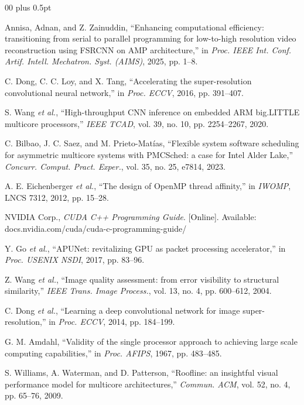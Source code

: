 \documentclass[conference]{IEEEtran}
\begin{document}
\begin{thebibliography}{00}
\footnotesize
\itemsep0pt plus 0.5pt

 Annisa, Adnan, and Z. Zainuddin, ``Enhancing computational efficiency: transitioning from serial to parallel programming for low-to-high resolution video reconstruction using FSRCNN on AMP architecture,'' in \emph{Proc. IEEE Int. Conf. Artif. Intell. Mechatron. Syst. (AIMS)}, 2025, pp. 1--8.

 C. Dong, C. C. Loy, and X. Tang, ``Accelerating the super-resolution convolutional neural network,'' in \emph{Proc. ECCV}, 2016, pp. 391--407.

 S. Wang \emph{et al.}, ``High-throughput CNN inference on embedded ARM big.LITTLE multicore processors,'' \emph{IEEE TCAD}, vol. 39, no. 10, pp. 2254--2267, 2020.

 C. Bilbao, J. C. Saez, and M. Prieto-Mat\'ias, ``Flexible system software scheduling for asymmetric multicore systems with PMCSched: a case for Intel Alder Lake,'' \emph{Concurr. Comput. Pract. Exper.}, vol. 35, no. 25, e7814, 2023.

 A. E. Eichenberger \emph{et al.}, ``The design of OpenMP thread affinity,'' in \emph{IWOMP}, LNCS 7312, 2012, pp. 15--28.

 NVIDIA Corp., \emph{CUDA C++ Programming Guide}. [Online]. Available: docs.nvidia.com/cuda/cuda-c-programming-guide/

 Y. Go \emph{et al.}, ``APUNet: revitalizing GPU as packet processing accelerator,'' in \emph{Proc. USENIX NSDI}, 2017, pp. 83--96.

 Z. Wang \emph{et al.}, ``Image quality assessment: from error visibility to structural similarity,'' \emph{IEEE Trans. Image Process.}, vol. 13, no. 4, pp. 600--612, 2004.

 C. Dong \emph{et al.}, ``Learning a deep convolutional network for image super-resolution,'' in \emph{Proc. ECCV}, 2014, pp. 184--199.

 G. M. Amdahl, ``Validity of the single processor approach to achieving large scale computing capabilities,'' in \emph{Proc. AFIPS}, 1967, pp. 483--485.

 S. Williams, A. Waterman, and D. Patterson, ``Roofline: an insightful visual performance model for multicore architectures,'' \emph{Commun. ACM}, vol. 52, no. 4, pp. 65--76, 2009.


\end{thebibliography}
\end{document}
